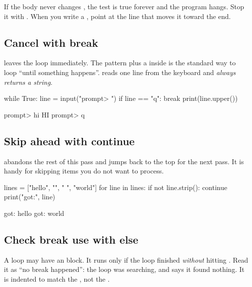 \begin{trap}
If the body never changes , the test is true forever and the program hangs. Stop it with
. When you write a , point at the line that moves it toward the end.
\end{trap}

\subsection{Cancel with break}

 leaves the loop immediately. The pattern  plus a  inside is the
standard way to loop ``until something happens''.  reads one line from the keyboard and
\emph{always returns a string}.

\begin{pycode}
while True:
    line = input("prompt> ")
    if line == "q":
        break
    print(line.upper())
\end{pycode}
\begin{rawcode}
prompt> hi
HI
prompt> q
\end{rawcode}

\subsection{Skip ahead with continue}

 abandons the rest of this pass and jumps back to the top for the next pass. It is handy
for skipping items you do not want to process.

\begin{pycode}
lines = ["hello", "", "   ", "world"]
for line in lines:
    if not line.strip():
        continue
    print("got:", line)
\end{pycode}
\begin{rawcode}
got: hello
got: world
\end{rawcode}

\subsection{Check break use with else}

A loop may have an  block. It runs only if the loop finished \emph{without} hitting .
Read it as ``no break happened'': the loop was searching, and  says it found nothing. It is
indented to match the , not the .

